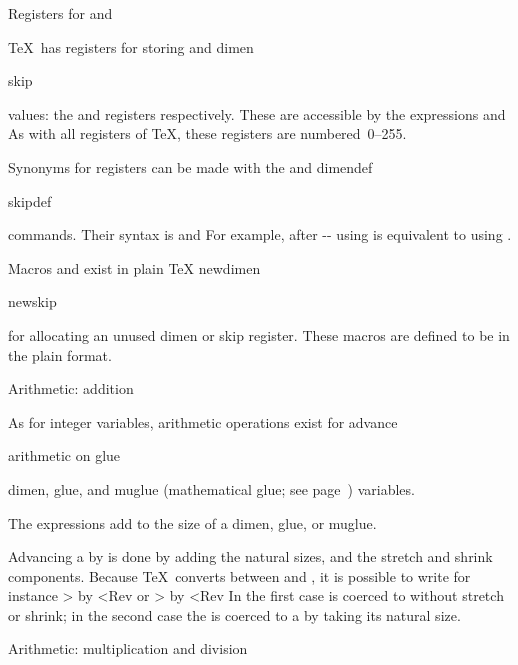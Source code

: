 \spoint Registers for  and 

\TeX\ has registers for storing  and 
\csterm dimen\par\csterm skip\par
values: the  and  registers
respectively. These are accessible by the expressions
\disp{}\> and
\disp{}\>
As with all registers of \TeX, these registers are
numbered~0--255.

Synonyms for registers can be made with the  and
\csterm dimendef\par\csterm skipdef\par
{} commands. Their syntax is
\Disp{}
\Dispstop
and 
\Disp{}\Dispstop
For example, after \ver-\skipdef{}- using 
is equivalent to using .

Macros  and  exist in plain \TeX
\csterm newdimen\par\csterm newskip\par
for allocating an unused dimen or skip register.
These macros are defined to be  in the plain format.

\spoint Arithmetic: addition

As for integer variables, arithmetic operations exist for
\csterm advance\par\term arithmetic on glue\par
dimen, glue, and muglue (mathematical glue; see page~\pgref[muglue])
variables.

The expressions
\Disp{}%
     \nl
     \nl
     \Dispstop
add to the size of a dimen, glue, or muglue.

Advancing a  by  is done by
adding the natural sizes, and the stretch and shrink components.
Because \TeX\ converts between  and ,
it is possible to write for instance
\Ver>\advance{} by <Rev or
\Ver>\advance{} by <Rev
In the first case   is coerced to  without
stretch or shrink; in the second case the  is coerced
to a  by taking its natural size.

\spoint Arithmetic: multiplication and division


